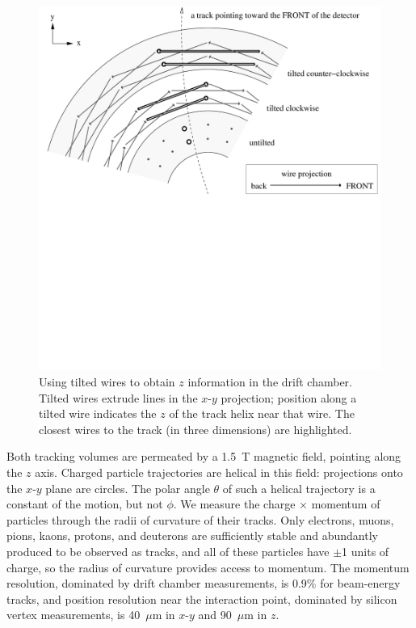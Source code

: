 \documentclass{cornell}
\begin{document}
\begin{figure}[p]
  \begin{center}
    \includegraphics[width=\linewidth, viewport=0 480 892 947]{newplots/stereotwist}
  \end{center}
  \caption[Using tilted wires to obtain $z$ information in the drift
  chamber]{\label{stereotwist} Using tilted wires to obtain $z$
  information in the drift chamber.  Tilted wires extrude lines in the
  $x$-$y$ projection; position along a tilted wire indicates the $z$
  of the track helix near that wire.  The closest wires to the track
  (in three dimensions) are highlighted.}
\end{figure}

Both tracking volumes are permeated by a 1.5~T magnetic field,
pointing along the $z$ axis.  Charged particle trajectories are
helical in this field: projections onto the $x$-$y$ plane are circles.
The polar angle $\theta$ of such a helical trajectory is a constant of
the motion, but not $\phi$.  We measure the charge $\times$ momentum
of particles through the radii of curvature of their tracks.  Only
electrons, muons, pions, kaons, protons, and deuterons are
sufficiently stable and abundantly produced to be observed as tracks,
and all of these particles have $\pm$1 units of charge, so the radius
of curvature provides access to momentum.  The momentum resolution,
dominated by drift chamber measurements, is 0.9\% for beam-energy
tracks, and position resolution near the interaction point, dominated
by silicon vertex measurements, is 40~$\mu$m in $x$-$y$ and 90~$\mu$m
in $z$.
\end{document}

